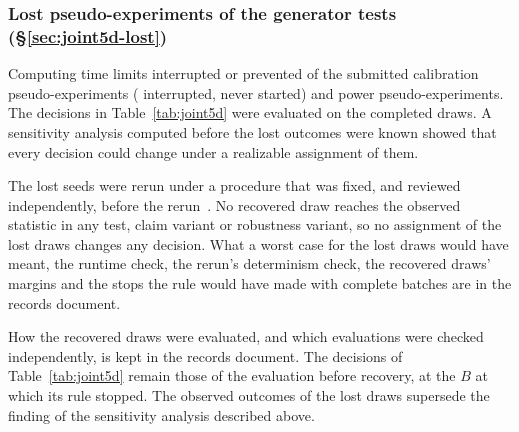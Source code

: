 \subsubsection{Lost pseudo-experiments of the generator tests (\S\ref{sec:joint5d-lost})}
\label{app:devhistory-lost}

Computing time limits interrupted or prevented \jtLostCal{} of the submitted calibration pseudo-experiments (\jtLostInterrupted{} interrupted, \jtLostNever{} never started) and \jtLostPow{} power pseudo-experiments. The decisions in Table~\ref{tab:joint5d} were evaluated on the completed draws. A sensitivity analysis computed before the lost outcomes were known showed that every decision could change under a realizable assignment of them.

The lost seeds were rerun under a procedure that was fixed, and reviewed independently, before the rerun~\cite{JointTestRecovery2026}. No recovered draw reaches the observed statistic in any test, claim variant or robustness variant, so no assignment of the lost draws changes any decision. What a worst case for the lost draws would have meant, the runtime check, the rerun's determinism check, the recovered draws' margins and the stops the rule would have made with complete batches are in the records document.

How the recovered draws were evaluated, and which evaluations were checked independently, is kept in the records document. The decisions of Table~\ref{tab:joint5d} remain those of the evaluation before recovery, at the $B$ at which its rule stopped. The observed outcomes of the lost draws supersede the finding of the sensitivity analysis described above.

